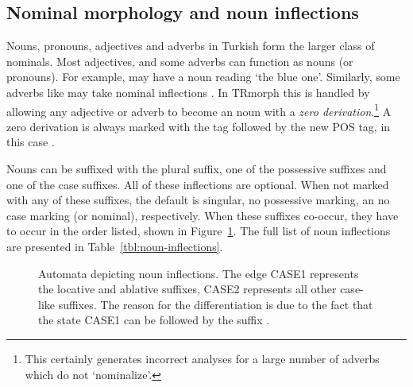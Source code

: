\documentclass[twocolumn]{article}
\begin{document}
\subsection{Nominal morphology and noun inflections}

Nouns, pronouns, adjectives and adverbs in Turkish form the larger
class of nominals. Most adjectives, and some adverbs can function as
nouns (or pronouns). For example,  may have a noun
reading `the blue one'. Similarly, some adverbs like
 may take nominal inflections
. In
TRmorph this is handled by allowing any adjective or adverb to become
an noun with a \emph{zero derivation}.\footnote{This certainly
generates incorrect analyses for a large number of adverbs which do
not `nominalize'.} A zero derivation is always marked with the tag
 followed by the new POS tag, in this case . 

Nouns can be suffixed with the plural suffix, one of the possessive
suffixes and one of the case suffixes. All of these inflections are
optional. When not marked with any of these suffixes, the default is  singular, 
no possessive marking, an no case marking (or nominal), respectively.
When these suffixes  co-occur, they
have to occur in the order listed, shown in 
Figure~\ref{fig:noun-inflections}. The full list of noun inflections are
presented in Table~\ref{tbl:noun-inflections}.

\begin{figure}
\caption{\label{fig:noun-inflections}Automata depicting noun
inflections. The edge CASE1 represents the locative and 
ablative suffixes, CASE2 represents all other case-like suffixes. The
reason for the differentiation is due to the fact that the state
CASE1 can be followed by the suffix .}
\end{figure}
\end{document}
